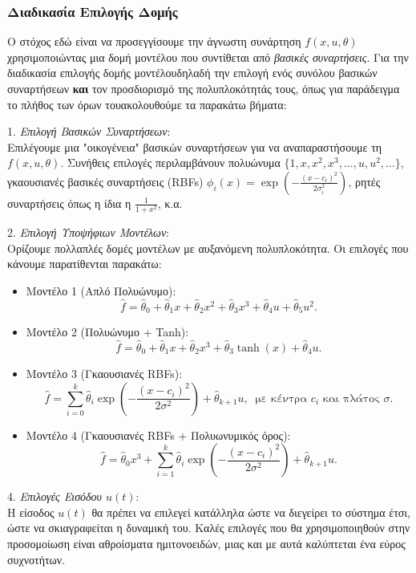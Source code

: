 \documentclass[12pt]{article} %
\numberwithin{equation}{section}  %
\begin{document}
\subsubsection{Διαδικασία Επιλογής Δομής}

Ο στόχος εδώ είναι να προσεγγίσουμε την άγνωστη συνάρτηση \(f(x, u, \theta)\) χρησιμοποιώντας μια δομή μοντέλου που συντίθεται από \textit{βασικές συναρτήσεις}. 
Για την διαδικασία επιλογής δομής μοντέλου\textemdash δηλαδή την επιλογή ενός συνόλου βασικών συναρτήσεων \textbf{και} τον προσδιορισμό της πολυπλοκότητάς τους, όπως για παράδειγμα το πλήθος των όρων του\textemdash ακολουθούμε τα παρακάτω βήματα:

1. \textit{Επιλογή Βασικών Συναρτήσεων}: \\
Επιλέγουμε μια "οικογένεια" βασικών συναρτήσεων για να αναπαραστήσουμε τη \(f(x, u, \theta)\). 
Συνήθεις επιλογές περιλαμβάνουν 
πολυώνυμα \( \{1, x, x^2, x^3, \dots, u, u^2, \dots\} \), 
γκαουσιανές βασικές συναρτήσεις (RBFs) \(\phi_i(x) = \exp\left(-\frac{(x - c_i)^2}{2\sigma_i^2}\right)\),
ρητές συναρτήσεις όπως η ίδια η \(\frac{1}{1 + x^2}\), κ.α.


2. \textit{Επιλογή Υποψήφιων Μοντέλων}: \\
Ορίζουμε πολλαπλές δομές μοντέλων με αυξανόμενη πολυπλοκότητα. Οι επιλογές που κάνουμε παρατίθενται παρακάτω:
\begin{itemize}[noitemsep, nolistsep]
    \item Μοντέλο 1 (Απλό Πολυώνυμο): 
    $$\hat{f} = \hat{\theta}_0 + \hat{\theta}_1 x + \hat{\theta}_2 x^2 + \hat{\theta}_3 x^3 + \hat{\theta}_4 u + \hat{\theta}_5 u^2.$$
    
    \item Μοντέλο 2 (Πολυώνυμο + Tanh): 
    $$\hat{f} = \hat{\theta}_0 + \hat{\theta}_1 x + \hat{\theta}_2 x^3 + \hat{\theta}_3 \tanh(x) + \hat{\theta}_4 u.$$
    
    \item Μοντέλο 3 (Γκαουσιανές RBFs): 
    $$\hat{f} = \sum_{i=0}^k \hat{\theta}_i \exp\left(-\frac{(x - c_i)^2}{2\sigma^2}\right) + \hat{\theta}_{k+1} u,\ \text{ με κέντρα \(c_i\) και πλάτος \(\sigma\)}.$$

    \item Μοντέλο 4 (Γκαουσιανές RBFs + Πολυωνυμικός όρος): 
    $$\hat{f} = \hat{\theta}_0 x^3 + \sum_{i=1}^k \hat{\theta}_i \exp\left(-\frac{(x - c_i)^2}{2\sigma^2}\right) + \hat{\theta}_{k+1} u.$$
\end{itemize}

4. \textit{Επιλογές Εισόδου \(u(t)\)}: \\ 
Η είσοδος \(u(t)\) θα πρέπει να επιλεγεί κατάλληλα ώστε να διεγείρει το σύστημα έτσι, ώστε να σκιαγραφείται η δυναμική του. 
Καλές επιλογές που θα χρησιμοποιηθούν στην προσομοίωση είναι αθροίσματα ημιτονοειδών, μιας και με αυτά καλύπτεται ένα εύρος συχνοτήτων. 
\end{document}
